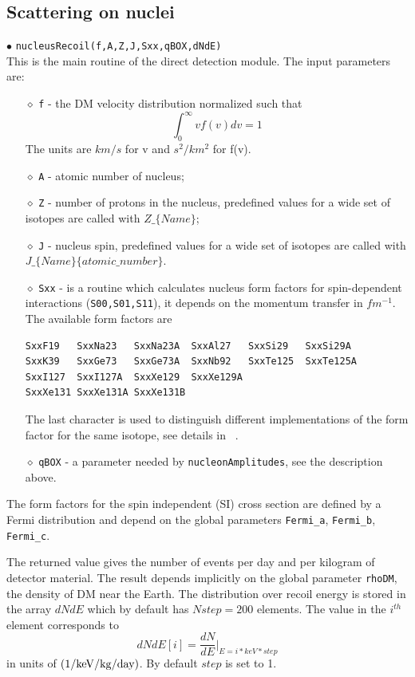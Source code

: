 \documentclass[12pt,a4paper]{article}
\begin{document}
\subsection{Scattering on nuclei}
\label{DDforNucleus}
$\bullet$ \verb|nucleusRecoil(f,A,Z,J,Sxx,qBOX,dNdE)|\\
This is the main routine of the  direct detection module. The
input parameters are:
\begin{itemize}
\item[$\diamond$]
\verb|f| -  the DM velocity distribution   normalized such that 
$$ \int_0^{\infty} v f(v) dv =1$$ 
The units  are $km/s$ for v and $s^2/km^2$ for  f(v).
\item[$\diamond$]
\verb|A| - atomic number of nucleus;
\item[$\diamond$]
\verb|Z| - number of protons in the nucleus, predefined values for a wide set of isotopes 
are called with $Z\_\{Name\}$;
\item[$\diamond$]
\verb|J| - nucleus spin,  predefined values for a wide set of isotopes
are called with\\
 $J\_\{Name\}\{atomic\_number\}$.
\item[$\diamond$]
\verb|Sxx| - is a routine which calculates nucleus form factors for
spin-dependent interactions (\verb|S00,S01,S11|), it depends  on the momentum
transfer in $fm^{-1}$. The available form factors are
\begin{verbatim}
SxxF19   SxxNa23   SxxNa23A  SxxAl27   SxxSi29   SxxSi29A  
SxxK39   SxxGe73   SxxGe73A  SxxNb92   SxxTe125  SxxTe125A 
SxxI127  SxxI127A  SxxXe129  SxxXe129A 
SxxXe131 SxxXe131A SxxXe131B
\end{verbatim}
The last character 
is used to distinguish different implementations of
the form factor for the same isotope, see details in ~\cite{Belanger:2008sj}.
\item[$\diamond$]
\verb|qBOX| - a parameter needed by \verb|nucleonAmplitudes|, see the description above.
\end{itemize}
The form factors for the spin independent (SI) cross section are defined by a Fermi distribution
and depend on the global parameters \verb|Fermi_a|, \verb|Fermi_b|,
\verb|Fermi_c|. 

The returned value gives the number of events per day and per kilogram of 
detector material. The  result depends  implicitly on the  global  parameter \verb|rhoDM|, the
density of DM near the Earth.
The distribution over recoil energy is stored in the array 
$dNdE$ which by default has $Nstep=200$ elements.  
The value in the $i^{th}$ element corresponds to
$$
dNdE[i] = \frac{dN}{dE}|_{E=i*keV*step}
$$
in units of ${\rm (1/keV/kg/day)}$. By default $step$  is set to 1. 
\end{document}
